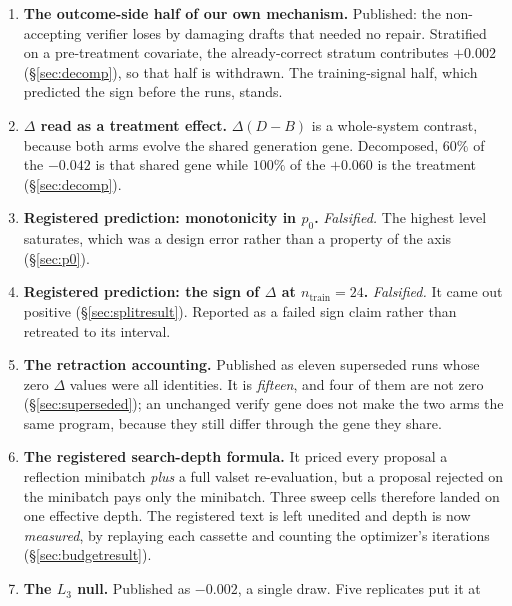 \documentclass[11pt]{article}
\newcommand{\dd}{\ensuremath{\Delta}}
\begin{document}
\begin{enumerate}
    On its single draw it is $1.28\sigma$, so we withdrew it. \textbf{That withdrawal is itself
    withdrawn}: five replicates of both rows give $+0.0640$ at $t = 6.11$
    (\S\ref{sec:curverepeat}), so the claim stands after all. Both movements are left on the
    record, because a register showing only the claims that were too strong would misrepresent
    which way this paper's errors ran.
  \item \textbf{The outcome-side half of our own mechanism.} Published: the non-accepting
    verifier loses by damaging drafts that needed no repair. Stratified on a pre-treatment
    covariate, the already-correct stratum contributes $+0.002$ (\S\ref{sec:decomp}), so that
    half is withdrawn. The training-signal half, which predicted the sign before the runs, stands.
  \item \textbf{$\dd$ read as a treatment effect.} $\dd(D-B)$ is a whole-system contrast, because
    both arms evolve the shared generation gene. Decomposed, $60\%$ of the $-0.042$ is that
    shared gene while $100\%$ of the $+0.060$ is the treatment (\S\ref{sec:decomp}).
  \item \textbf{Registered prediction: monotonicity in $p_0$.} \emph{Falsified.} The highest
    level saturates, which was a design error rather than a property of the axis
    (\S\ref{sec:p0}).
  \item \textbf{Registered prediction: the sign of $\dd$ at $n_{\mathrm{train}} = 24$.}
    \emph{Falsified.} It came out positive (\S\ref{sec:splitresult}). Reported as a failed sign
    claim rather than retreated to its interval.
  \item \textbf{The retraction accounting.} Published as eleven superseded runs whose zero
    $\dd$ values were all identities. It is \emph{fifteen}, and four of them are not zero
    (\S\ref{sec:superseded}); an unchanged verify gene does not make the two arms the same
    program, because they still differ through the gene they share.
  \item \textbf{The registered search-depth formula.} It priced every proposal a reflection
    minibatch \emph{plus} a full valset re-evaluation, but a proposal rejected on the minibatch
    pays only the minibatch. Three sweep cells therefore landed on one effective depth. The
    registered text is left unedited and depth is now \emph{measured}, by replaying each cassette
    and counting the optimizer's iterations (\S\ref{sec:budgetresult}).
  \item \textbf{The $L_3$ null.} Published as $-0.002$, a single draw. Five replicates put it at

\end{enumerate}
\end{document}
